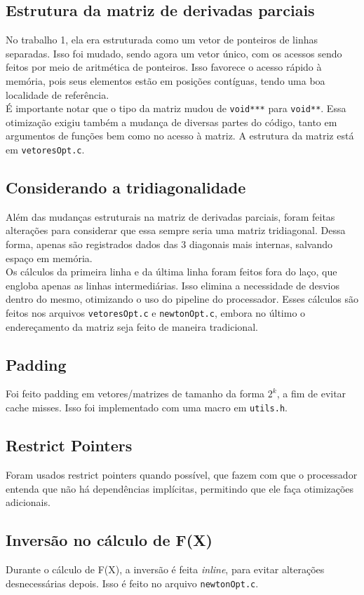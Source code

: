 \documentclass{article}
\begin{document}
\subsection{Estrutura da matriz de derivadas parciais}
No trabalho 1, ela era estruturada como um vetor de ponteiros de linhas separadas. Isso foi mudado, sendo agora um vetor único, com os acessos sendo feitos por meio de aritmética de ponteiros.
Isso favorece o acesso rápido à memória, pois seus elementos estão em posições contíguas, tendo uma boa localidade de referência.\\
É importante notar que o tipo da matriz mudou de \texttt{void***} para \texttt{void**}.
Essa otimização exigiu também a mudança de diversas partes do código, tanto em argumentos de funções bem como no acesso à matriz.
A estrutura da matriz está em \texttt{vetoresOpt.c}.

\subsection{Considerando a tridiagonalidade}
Além das mudanças estruturais na matriz de derivadas parciais, foram feitas alterações para considerar que essa sempre seria uma matriz tridiagonal.
Dessa forma, apenas são registrados dados das 3 diagonais mais internas, salvando espaço em memória.\\
Os cálculos da primeira linha e da última linha foram feitos fora do laço, que engloba apenas as linhas intermediárias.
Isso elimina a necessidade de desvios dentro do mesmo, otimizando o uso do pipeline do processador.
Esses cálculos são feitos nos arquivos \texttt{vetoresOpt.c} e \texttt{newtonOpt.c}, embora no último o endereçamento da matriz seja feito de maneira tradicional.

\subsection{Padding}
Foi feito padding em vetores/matrizes de tamanho da forma $2^k$, a fim de evitar cache misses.
Isso foi implementado com uma macro em \texttt{utils.h}.

\subsection{Restrict Pointers}
Foram usados restrict pointers quando possível, que fazem com que o processador entenda que não há dependências implícitas, permitindo que ele faça otimizações adicionais.

\subsection{Inversão no cálculo de F(X)}
Durante o cálculo de F(X), a inversão é feita \textit{inline}, para evitar alterações desnecessárias depois.
Isso é feito no arquivo \texttt{newtonOpt.c}.
\end{document}
